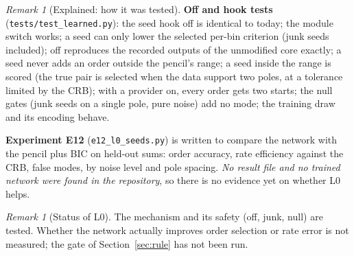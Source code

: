 \documentclass[11pt]{article}
\theoremstyle{plain}
\theoremstyle{definition}
\theoremstyle{remark}
\newtheorem{remark}[theorem]{Remark}
\newenvironment{capbox}[1]{\begin{remark}[#1]}{\end{remark}}
\newenvironment{explained}[1]{\begin{remark}[Explained: #1]}{\end{remark}}
\begin{document}
\begin{explained}{how it was tested}
\textbf{Off and hook tests} (\texttt{tests/test\_learned.py}): the seed hook off is identical to today; the module switch works; a seed can only lower the selected per-bin criterion (junk seeds included); off reproduces the recorded outputs of the unmodified core exactly; a seed never adds an order outside the pencil's range; a seed inside the range is scored (the true pair is selected when the data support two poles, at a tolerance limited by the CRB); with a provider on, every order gets two starts; the null gates (junk seeds on a single pole, pure noise) add no mode; the training draw and its encoding behave.

\medskip\textbf{Experiment E12} (\texttt{e12\_l0\_seeds.py}) is written to compare the network with the pencil plus BIC on held-out sums: order accuracy, rate efficiency against the CRB, false modes, by noise level and pole spacing. \emph{No result file and no trained network were found in the repository}, so there is no evidence yet on whether L0 helps.
\end{explained}

\begin{capbox}{Status of L0}
The mechanism and its safety (off, junk, null) are tested. Whether the network actually improves order selection or rate error is not measured; the gate of Section~\ref{sec:rule} has not been run.
\end{capbox}
\end{document}
